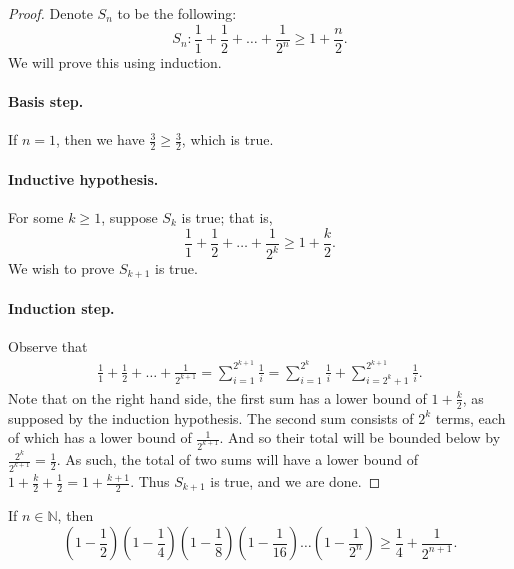 \documentclass{exam}
\newcommand{\paren}[1]{\left(#1\right)}
\begin{document}
\begin{proof}
    Denote $S_n$ to be the following: $$S_n:\frac11+\frac12+\dots+\frac1{2^n}\ge1+\frac{n}2.$$ We will prove this using induction.
    
    \paragraph{Basis step.} If $n = 1$, then we have $\frac32\ge\frac32$, which is true.
    
    \paragraph{Inductive hypothesis.} For some $k\ge1$, suppose $S_k$ is true; that is, $$\frac11+\frac12+\dots+\frac1{2^k} \ge 1+\frac{k}2.$$ We wish to prove $S_{k+1}$ is true.

    \paragraph{Induction step.} Observe that
    \begin{align*}
        \frac11+\frac12+\dots+\frac1{2^{k+1}}=\sum_{i=1}^{2^{k+1}}\frac1i=\sum_{i=1}^{2^k}\frac1i+\sum_{i=2^k+1}^{2^{k+1}}\frac1i.
    \end{align*}
    Note that on the right hand side, the first sum has a lower bound of $1+\frac{k}2$, as supposed by the induction hypothesis. The second sum consists of $2^k$ terms, each of which has a lower bound of $\frac1{2^{k+1}}$. And so their total will be bounded below by $\frac{2^k}{2^{k+1}}=\frac12$. As such, the total of two sums will have a lower bound of $1+\frac{k}2+\frac12 = 1 + \frac{k+1}2$. Thus $S_{k+1}$ is true, and we are done.
\end{proof}

\begin{proposition}{10.22}
    If $n\in\mathbb N$, then $$\paren{1-\frac12}\paren{1-\frac14}\paren{1-\frac18}\paren{1-\frac1{16}}\dots\paren{1-\frac1{2^n}}\ge\frac14+\frac1{2^{n+1}}.$$
\end{proposition}
\end{document}
